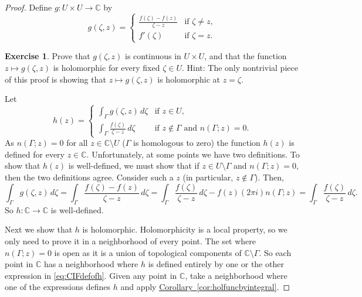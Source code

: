 \documentclass[12pt,openany]{book}
\newcommand{\C}{{\mathbb{C}}}
\theoremstyle{plain}
\theoremstyle{remark}
\theoremstyle{definition}
\newenvironment{exbox}{%
    \def\FrameCommand{\vrule width 1pt \relax\hspace{10pt}}%
    \MakeFramed{\advance\hsize-\width\FrameRestore}%
}{%
    \endMakeFramed
}
\theoremstyle{exercise}
\newtheorem{exercise}{Exercise}[section]
\theoremstyle{example}
\newcommand{\corref}[1]{\hyperref[#1]{Corollary~\ref*{#1}}}
\begin{document}
\begin{proof}
Define $g \colon U \times U \to \C$ by
\begin{equation*}
g(\zeta,z) =
\begin{cases}
\frac{f(\zeta)-f(z)}{\zeta-z} & \text{if } \zeta \not= z , \\
f'(\zeta)                 & \text{if } \zeta = z .
\end{cases}
\end{equation*}

\begin{exbox}
\begin{exercise}
Prove that $g(\zeta,z)$ is continuous in $U \times U$, and that
the function $z \mapsto g(\zeta,z)$ is holomorphic for every fixed $\zeta \in U$.
Hint: The only nontrivial piece of this proof is showing that $z \mapsto
g(\zeta,z)$ is
holomorphic at $z=\zeta$.
\end{exercise}
\end{exbox}

Let
\begin{equation}\label{eq:CIFdefofh}
h(z) = 
\begin{cases}
\int_\Gamma g(\zeta,z) \, d\zeta & \text{if } z \in U , \\
\int_\Gamma \frac{f(\zeta)}{\zeta-z} \, d\zeta & \text{if } z \not \in
\Gamma \text{ and } n(\Gamma;z) = 0 .
\end{cases}
\end{equation}
As $n(\Gamma;z) = 0$ for all $z \in \C \setminus U$
($\Gamma$ is homologous to zero)
the function $h(z)$ is defined for every $z \in \C$.
Unfortunately, at some points
we have two definitions.
To show that $h(z)$ is well-defined, we must show that if
$z \in U \setminus \Gamma$ and
$n(\Gamma;z) = 0$, then the two definitions agree.
Consider such a $z$ (in particular, $z \notin \Gamma$).  Then,
\begin{equation*}
\int_\Gamma g(\zeta,z) \, d\zeta
=
\int_\Gamma \frac{f(\zeta)-f(z)}{\zeta-z} \, d\zeta
=
\int_\Gamma \frac{f(\zeta)}{\zeta-z} \, d\zeta
-
f(z) (2\pi i) n(\Gamma;z)
=
\int_\Gamma \frac{f(\zeta)}{\zeta-z} \, d\zeta .
\end{equation*}
So $h \colon \C \to \C$ is well-defined.

Next we show that $h$ is
holomorphic.
Holomorphicity is a local property, so we only need to prove it 
in a neighborhood of every point.
The set where $n(\Gamma;z) = 0$ is open as it is a
union of topological components of $\C \setminus \Gamma$.
So each point in $\C$ has a neighborhood where $h$ is defined
entirely by one or the other expression in \eqref{eq:CIFdefofh}.
Given any point in $\C$,
take a neighborhood where one of the expressions defines
$h$ and apply \corref{cor:holfuncbyintegral}.


\end{proof}
\end{document}
